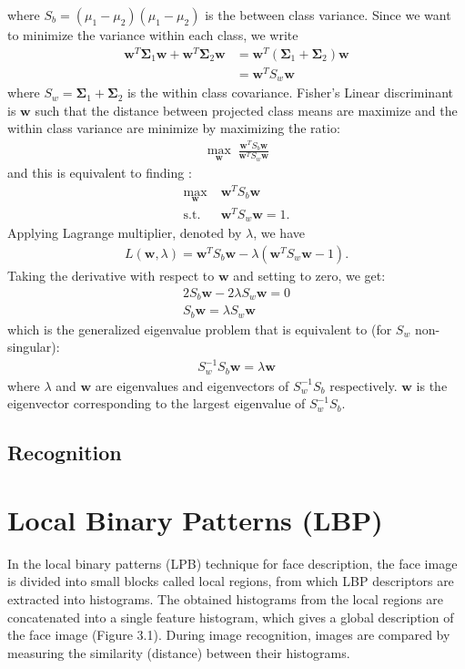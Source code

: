 where $S_b=\left(\mu_1-\mu_2\right)\left(\mu_1-\mu_2\right)$ is the between class variance. Since we want to minimize the variance within each class, we write \begin{align*}
\mathbf{w}^T\mathbf{\Sigma}_1\mathbf{w} +\mathbf{w}^T\mathbf{\Sigma}_2\mathbf{w} &= \mathbf{w}^T\left(\mathbf{\Sigma}_1+\mathbf{\Sigma}_2\right) \mathbf{w}\\
&= \mathbf{w}^TS_w \mathbf{w}
\end{align*}
where $S_w=\mathbf{\Sigma}_1+\mathbf{\Sigma}_2$ is the within class covariance. Fisher's Linear discriminant is $\mathbf{w}$ such that the distance between projected class means are maximize and the within class variance are minimize by maximizing the ratio:
\begin{align*}
\max_{\mathbf{w}}\; \frac{\mathbf{w}^TS_b\mathbf{w}}{\mathbf{w}^TS_w\mathbf{w}}
\end{align*}
and this is equivalent to finding :\begin{align*}
\max_{\mathbf{w}}\; &\mathbf{w}^TS_b\mathbf{w}\\
\mathrm{s.t.}\; & \mathbf{w}^TS_w\mathbf{w}=1.
\end{align*}
Applying Lagrange multiplier, denoted by $\lambda$, we have \begin{align*}
L(\mathbf{w}, \lambda) = \mathbf{w}^TS_b\mathbf{w} -\lambda\left(\mathbf{w}^TS_w\mathbf{w}-1\right). 
\end{align*}
Taking the derivative with respect to $\mathbf{w}$ and setting to zero, we get: \begin{align*}
2S_b\mathbf{w} - 2\lambda S_w\mathbf{w}=0\\
S_b\mathbf{w}= \lambda S_w\mathbf{w}
\end{align*}
which is the generalized eigenvalue problem that is equivalent to (for $S_w$ non-singular):\begin{align*}
S_w^{-1}S_b\mathbf{w} =\lambda \mathbf{w}
\end{align*}
where $\lambda$ and $\mathbf{w}$ are eigenvalues and eigenvectors of $S_w^{-1}S_b$ respectively. $\mathbf{w}$ is the eigenvector corresponding to the largest eigenvalue of $S_w^{-1}S_b$.

\subsection{Recognition}

\section{Local Binary Patterns (LBP)}
In the local binary patterns (LPB) technique for face description, the face image is divided into small blocks called local regions, from which LBP descriptors are extracted into histograms. The obtained histograms from the local regions are concatenated into a single feature histogram, which gives a global description of the face image (Figure 3.1). During image recognition, images are compared by measuring the similarity (distance) between their histograms.

